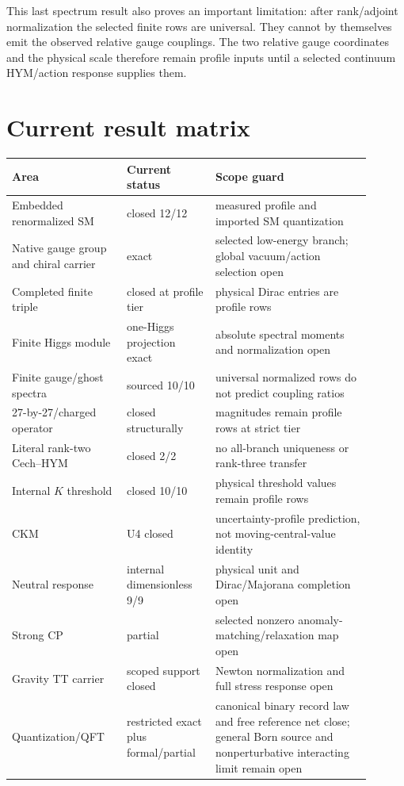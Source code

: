 \documentclass[11pt]{article}
\begin{document}
This last spectrum result also proves an important limitation: after
rank/adjoint normalization the selected finite rows are universal. They cannot
by themselves emit the observed relative gauge couplings. The two relative
gauge coordinates and the physical scale therefore remain profile inputs
until a selected continuum HYM/action response supplies them.

\section{Current result matrix}

\begin{center}
\begin{tabular}{p{0.29\linewidth}p{0.22\linewidth}p{0.39\linewidth}}
\toprule
Area & Current status & Scope guard \\
\midrule
Embedded renormalized SM & closed 12/12 & measured profile and imported SM
quantization \\
Native gauge group and chiral carrier & exact & selected low-energy branch;
global vacuum/action selection open \\
Completed finite triple & closed at profile tier & physical Dirac entries are
profile rows \\
Finite Higgs module & one-Higgs projection exact & absolute spectral moments
and normalization open \\
Finite gauge/ghost spectra & sourced 10/10 & universal normalized rows do not
predict coupling ratios \\
27-by-27/charged operator & closed structurally & magnitudes remain profile
rows at strict tier \\
Literal rank-two Cech--HYM & closed 2/2 & no all-branch uniqueness or
rank-three transfer \\
Internal $K$ threshold & closed 10/10 & physical threshold values remain
profile rows \\
CKM & U4 closed & uncertainty-profile prediction, not moving-central-value
identity \\
Neutral response & internal dimensionless 9/9 & physical unit and
Dirac/Majorana completion open \\
Strong CP & partial & selected nonzero anomaly-matching/relaxation map open \\
Gravity TT carrier & scoped support closed & Newton normalization and full
stress response open \\
Quantization/QFT & restricted exact plus formal/partial & canonical binary
record law and free reference net close; general Born source and
nonperturbative interacting limit remain open \\
\bottomrule
\end{tabular}
\end{center}
\end{document}
